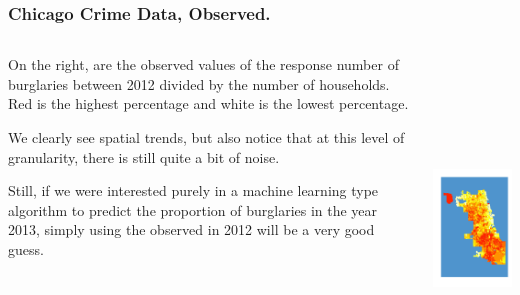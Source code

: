 \begin{frame}
  \frametitle{Chicago Crime Data, Observed.}
  \footnotesize

  \begin{columns}[T]
    \begin{column}{.5\textwidth}
     \begin{block}{}
  On the right, are the observed values of the response number of burglaries
  between 2012 divided by the number of households. Red is the highest
  percentage and white is the lowest percentage. \\

  \medskip

  We clearly see spatial trends, but also notice that at this level of granularity,
  there is still quite a bit of noise.

  \medskip

  Still, if we were interested purely in a machine learning type algorithm to predict
  the proportion of burglaries in the year 2013, simply using the observed in 2012
  will be a very good guess.

    \end{block}
    \end{column}
    \begin{column}{.5\textwidth}
    \vspace{-0.3cm}
  \includegraphics[height=3.6in]{img/chi1}
    \end{column}
  \end{columns}

\end{frame}


